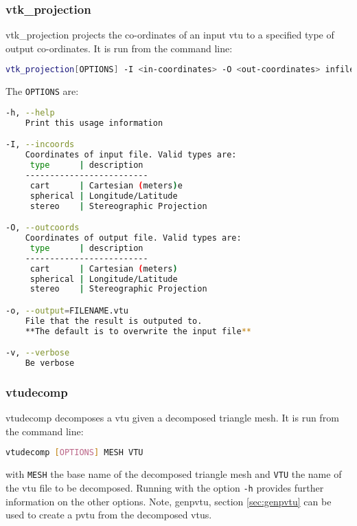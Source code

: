 \subsubsection{vtk\_projection}
\label{sec:vtkprojection}
vtk\_projection projects the co-ordinates of an input vtu to a specified type of output co-ordinates. It is run from the command line:
\begin{lstlisting}[language = Bash]
vtk_projection[OPTIONS] -I <in-coordinates> -O <out-coordinates> infile.vtu
\end{lstlisting}

The \lstinline[language = Bash]+OPTIONS+ are:
\begin{lstlisting}[language = Bash]
-h, --help
	Print this usage information

-I, --incoords
	Coordinates of input file. Valid types are:
	 type      | description 
	-------------------------
	 cart      | Cartesian (meters)e
	 spherical | Longitude/Latitude
	 stereo    | Stereographic Projection

-O, --outcoords
	Coordinates of output file. Valid types are:
	 type      | description 
	-------------------------
	 cart      | Cartesian (meters)
	 spherical | Longitude/Latitude
	 stereo    | Stereographic Projection

-o, --output=FILENAME.vtu
	File that the result is outputed to. 
	**The default is to overwrite the input file**

-v, --verbose
	Be verbose

\end{lstlisting}


\subsubsection{vtudecomp}
\label{sec:vtudecomp}

vtudecomp decomposes a vtu given a decomposed triangle mesh. It is run from the command line:
\begin{lstlisting}[language = Bash]
vtudecomp [OPTIONS] MESH VTU
\end{lstlisting}
with \lstinline[language = Bash]+MESH+ the base name of the decomposed triangle mesh and \lstinline[language = Bash]+VTU+ the name of the vtu file to be decomposed. Running with the option \lstinline[language = Bash]+-h+ provides further information on the other options. Note, genpvtu, section \ref{sec:genpvtu} can be used to create a pvtu from the decomposed vtus.


